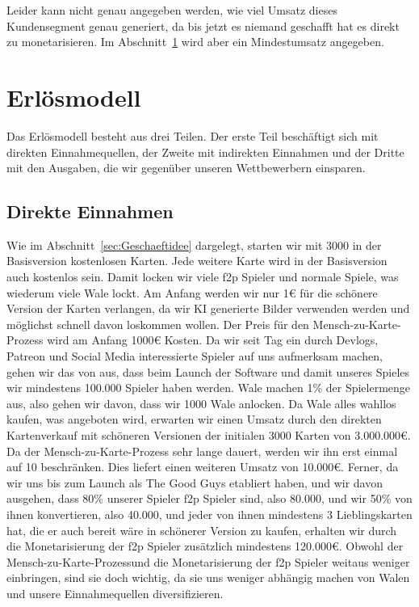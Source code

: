 \documentclass[fontsize=12, a4aper]{scrartcl}
\begin{document}
\noindent Leider kann nicht genau angegeben werden, wie viel Umsatz dieses Kundensegment genau generiert, da bis jetzt es niemand geschafft hat es direkt zu monetarisieren. Im Abschnitt~\ref{sec:Erloesmodell} wird aber ein Mindestumsatz angegeben.

\section{Erlösmodell} \label{sec:Erloesmodell}

Das Erlösmodell besteht aus drei Teilen. Der erste Teil beschäftigt sich mit direkten Einnahmequellen, der Zweite mit indirekten Einnahmen und der Dritte mit den Ausgaben, die wir gegenüber unseren Wettbewerbern einsparen.

\subsection{Direkte Einnahmen} \label{subsec:Direkte_Einnahmen}

Wie im Abschnitt~\ref{sec:Geschaeftidee} dargelegt, starten wir mit 3000 in der Basisversion kostenlosen Karten. Jede weitere Karte wird in der Basisversion auch kostenlos sein. Damit locken wir viele \acl{f2p} Spieler und normale Spiele, was wiederum viele Wale lockt. Am Anfang werden wir nur 1€ für die schönere Version der Karten verlangen, da wir KI generierte Bilder verwenden werden und möglichst schnell davon loskommen wollen. Der Preis für den \glqq Mensch-zu-Karte-Prozess\grqq{} wird am Anfang 1000€ Kosten. Da wir seit Tag ein durch Devlogs, Patreon und Social Media interessierte Spieler auf uns aufmerksam machen, gehen wir das von aus, dass beim Launch der Software und damit unseres Spieles wir mindestens 100.000 Spieler haben werden. Wale machen 1\% der Spielermenge aus, also gehen wir davon, dass wir 1000 Wale anlocken. Da Wale alles wahllos kaufen, was angeboten wird, erwarten wir einen Umsatz durch den direkten Kartenverkauf mit schöneren Versionen der initialen 3000 Karten von 3.000.000€. Da der \glqq Mensch-zu-Karte-Prozess\grqq{} sehr lange dauert, werden wir ihn erst einmal auf 10 beschränken. Dies liefert einen weiteren Umsatz von 10.000€. Ferner, da wir uns bis zum Launch als \glqq The Good Guys\grqq{} etabliert haben, und wir davon ausgehen, dass 80\% unserer Spieler \acl{f2p} Spieler sind, also 80.000, und wir 50\% von ihnen konvertieren, also 40.000, und jeder von ihnen mindestens 3 Lieblingskarten hat, die er auch bereit wäre in schönerer Version zu kaufen, erhalten wir durch die Monetarisierung der \ac{f2p} Spieler zusätzlich mindestens 120.000€. Obwohl der \glqq Mensch-zu-Karte-Prozess\grqq und die Monetarisierung der \ac{f2p} Spieler weitaus weniger einbringen, sind sie doch wichtig, da sie uns weniger abhängig machen von Walen und unsere Einnahmequellen diversifizieren.\hfill\newline
\end{document}

